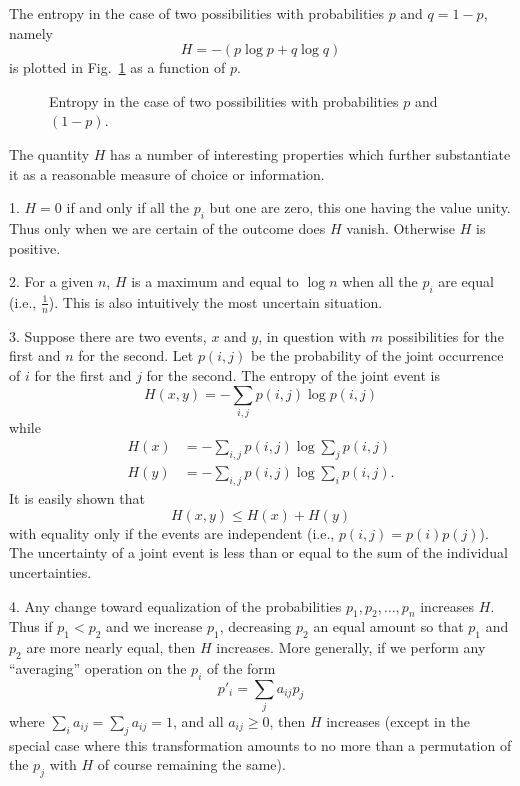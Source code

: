 The entropy in the case of two possibilities with probabilities $p$
and $q= 1-p$, namely
$$
H = - (p \log p + q \log q)
$$
is plotted in Fig.~\ref{fig:7} as a function of $p$.
\begin{figure}[ht]
\centerline{}
\caption{Entropy in the case of two possibilities with probabilities
$p$ and $(1-p)$.}
\label{fig:7}
\end{figure}

The quantity $H$ has a number of interesting properties which further
substantiate it as a reasonable measure of choice or information.

1. $H=0$ if and only if all the $p_i$ but one are zero, this one having
the value unity.  Thus only when we are certain of the outcome does
$H$ vanish.  Otherwise $H$ is positive.

2. For a given $n$, $H$ is a maximum and equal to $\log n$ when all the
$p_i$ are equal (i.e., $\frac1n$).  This is also intuitively the most
uncertain situation.

3. Suppose there are two events, $x$ and $y$, in question with $m$
possibilities for the first and $n$ for the second.  Let $p(i,j)$ be
the probability of the joint occurrence of $i$ for the first and $j$ for
the second.  The entropy of the joint event is
$$
H(x,y) = - \sum_{i,j} p(i,j) \log p(i,j)
$$
while
\begin{align*}
H(x) &= - \sum_{i,j} p(i,j) \log \sum_j p(i,j) \\
H(y) &= - \sum_{i,j} p(i,j) \log \sum_i p(i,j).
\end{align*}
It is easily shown that
$$
H(x,y) \le H(x) + H(y)
$$
with equality only if the events are independent (i.e., $p(i,j) = p(i)
p(j)$).  The uncertainty of a joint event is less than or equal to the
sum of the individual uncertainties.

4. Any change toward equalization of the probabilities $p_1,p_2,\dots,
p_n$ increases $H$.  Thus if $p_1 < p_2$ and we increase $p_1$, decreasing
$p_2$ an equal amount so that $p_1$ and $p_2$ are more nearly equal,
then $H$ increases.  More generally, if we perform any ``averaging''
operation on the $p_i$ of the form
$$
p'_i = \sum_j a_{ij} p_j
$$
where $\sum_i a_{ij} = \sum_j a_{ij}=1$, and all $a_{ij} \ge 0$, then $H$
increases (except in the special case where this transformation amounts
to no more than a permutation of the $p_j$ with $H$ of course remaining
the same).

